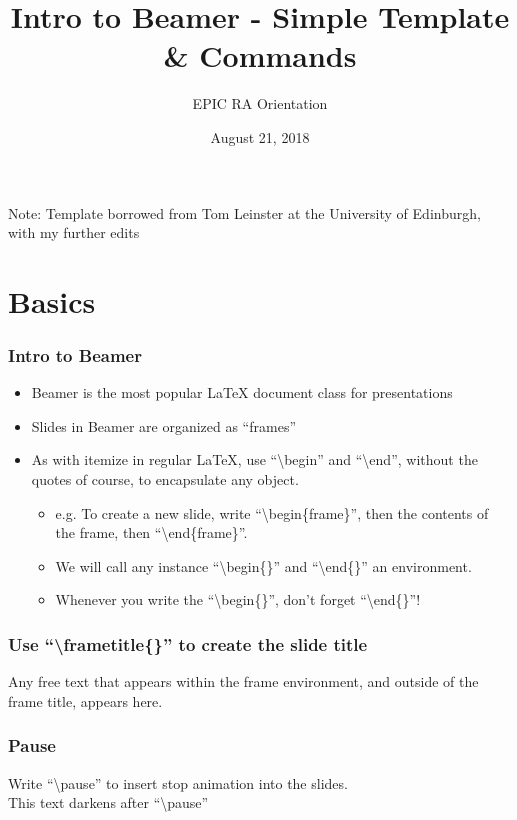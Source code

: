 \documentclass{beamer}
\title{Intro to Beamer - Simple Template \& Commands}
\author{EPIC RA Orientation}
\date{August 21, 2018}
\begin{document}
\begin{frame}
\titlepage
\centering
\tiny{Note: Template borrowed from Tom Leinster at the University of Edinburgh, with my further edits}
\end{frame}

\section{Basics}
\begin{frame}
\frametitle{Intro to Beamer}
\begin{itemize}
	\item<1> Beamer is the most popular LaTeX document class for presentations
	\vspace{0.2cm}
	\item<2> Slides in Beamer are organized as ``frames''
	\vspace{0.2cm}
	\item<3> As with itemize in regular LaTeX, use ``\textbackslash begin'' and ``\textbackslash end'', without the quotes of course, to encapsulate any object.
	\vspace{0.2cm}
	\begin{itemize}
		\item<3> e.g. To create a new slide, write ``\textbackslash begin\{frame\}'', then the contents of the frame, then ``\textbackslash end\{frame\}''. 
		\vspace{0.2cm}
		\item<3> We will call any instance ``\textbackslash begin\{\}'' and ``\textbackslash end\{\}'' an environment.
		\vspace{0.2cm}
		\item<3> Whenever you write the ``\textbackslash begin\{\}'', don't forget ``\textbackslash end\{\}''!
	\end{itemize}
\end{itemize}
\end{frame}

\begin{frame}
\frametitle{Use ``\textbackslash frametitle\{\}'' to create the slide title}
Any free text that appears within the frame environment, and outside of the frame title, appears here.
\end{frame}

\begin{frame}
\frametitle{Pause}
Write ``\textbackslash pause'' to insert stop animation into the slides.
\pause
\\[1em]
This text darkens after ``\textbackslash pause''
\end{frame}
\end{document}
